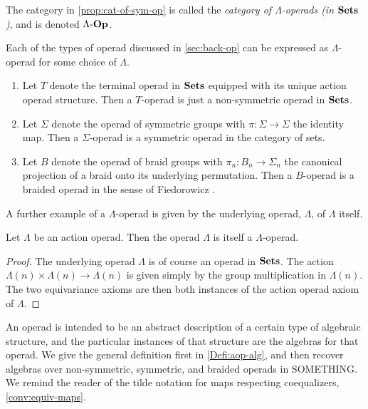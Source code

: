 \begin{nota}\label{nota:cat-of-L-op}
The category in \cref{prop:cat-of-sym-op} is called the \emph{category of $\Lambda$-operads (in $\mathbf{Sets}$)}, and is denoted $\Lambda\mbox{-}\mathbf{Op}$.
\end{nota}


\begin{example}
Each of the types of operad discussed in \cref{sec:back-op} can be expressed as $\Lambda$-operad for some choice of $\Lambda$.
  \begin{enumerate}
    \item Let $T$ denote the terminal operad in $\mathbf{Sets}$ equipped with its unique action operad structure. Then a $T$-operad is just a non-symmetric operad in $\mathbf{Sets}$.
    \item Let $\Sigma$ denote the operad of symmetric groups with $\pi \colon \Sigma \rightarrow \Sigma$ the identity map. Then a $\Sigma$-operad is a symmetric operad in the category of sets.
    \item Let $B$ denote the operad of braid groups with $\pi_{n} \colon B_{n} \rightarrow \Sigma_{n}$ the canonical projection of a braid onto its underlying permutation. Then a $B$-operad is a braided operad in the sense of Fiedorowicz \cite{fie-br}.
  \end{enumerate}
\end{example}

A further example of a $\Lambda$-operad is given by the underlying operad, $\Lambda$, of $\Lambda$ itself.
\begin{prop}\label{prop:gisgop}
Let $\Lambda$ be an action operad. Then the operad $\Lambda$ is itself a $\Lambda$-operad.
\end{prop}
\begin{proof}
The underlying operad $\Lambda$ is of course an operad in $\mathbf{Sets}$. The action $\Lambda(n) \times \Lambda(n) \rightarrow \Lambda(n)$ is given simply by the group multiplication in $\Lambda(n)$. The two equivariance axioms are then both instances of the action operad axiom of $\Lambda$.
\end{proof}

An operad is intended to be an abstract description of a certain type of algebraic structure, and the particular instances of that structure are the algebras for that operad. 
We give the general definition first in \cref{Defi:aop-alg}, and then recover algebras over non-symmetric, symmetric, and braided operads in SOMETHING.
We remind the reader of the tilde notation for maps respecting coequalizers, \cref{conv:equiv-maps}.

